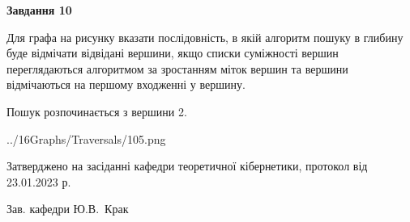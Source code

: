\documentclass[12pt, ukrainian]{article}
\begin{document}
{\begin {large}
{\begin {center}\textbf{Завдання 10}\end {center}}\par
Для графа на рисунку вказати послідовність, в якій алгоритм пошуку в глибину буде відмічати відвідані вершини, якщо списки суміжності вершин переглядаються алгоритмом за зростанням міток вершин та вершини відмічаються на першому вход\-женні у вершину.\par
Пошук розпочинається з вершини 2.\par

\begin{center}
	{../16Graphs/Traversals/105.png}
\end{center}\par
\newpage


\end {large}
}
{\smallskip \begin {small} Затверджено на засіданні кафедри теоретичної кібернетики, протокол  від   23.01.2023 р.\par\smallskip\smallskip
{\parbox {6.5 cm}{Зав. кафедри \dotfill Ю.В.~Крак}} \end{small}}
\end{document}
